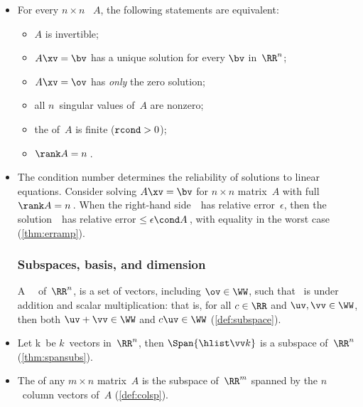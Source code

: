 \begin{itemize}
\itemme For every matrix~\(A\), let an \svd\ of~\(A\) be~\(\usv\), then the transpose~\(\tr A\) has an \svd\ of \(V(\tr S)\tr U\) (\cref{thm:ranktr}). 
Further, \(\rank(\tr A)=\rank A\)\,.

\item For every \(n\times n\) ~\(A\), the following statements are equivalent: 
\begin{itemize}
\item \(A\) is {invertible};
\item \(A\xv=\bv\) has a {unique solution} for every \(\bv\) in~\(\RR^n\);
\item \(A\xv=\ov\) has \emph{only} the zero solution;
\item all \(n\)~{singular value}s of~\(A\) are nonzero;
\item the  of~\(A\) is finite (\(\verb|rcond|>0\));
\item \(\rank A=n\)\,.
\end{itemize}

\item The condition number determines the reliability of solutions to linear equations.
Consider solving \(A\xv=\bv\) for \(n\times n\) matrix~\(A\) with full \(\rank A=n\)\,.  
When the right-hand side~\bv\ has relative error~\(\epsilon\), then the solution~\xv\ has relative error\({}\leq\epsilon\cond A\)\,, with equality in the worst case (\cref{thm:erramp}).





\subsubsection{Subspaces, basis, and dimension}

\itemhi A ~\WW\ of~\(\RR^n\),  is a set of vectors, including \(\ov\in\WW\), such that \WW\ is  under addition and scalar multiplication: that is, for all \(c\in\RR\) and \(\uv,\vv\in\WW\), then both \(\uv+\vv\in\WW\) and \(c\uv\in\WW\) (\cref{def:subspace}).

\item Let \hlist\vv k\ be \(k\)~vectors in~\(\RR^n\),
then \(\Span\{\hlist\vv k\}\) is a {subspace} of~\(\RR^n\) (\cref{thm:spansubs}).

\item The  of any $m\times n$ matrix~$A$ is the {subspace} of~$\RR^m$ {span}ned by the \(n\)~{column vector}s of~$A$ (\cref{def:colsp}).
        

\end{itemize}
